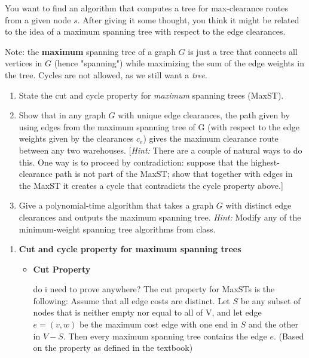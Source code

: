 \documentclass[letterpaper,11pt]{article}
\begin{document}
\begin{enumerate}
    You want to find an algorithm that computes a tree for max-clearance routes from a given node $s$. After giving it some thought, you think it might be related to the idea of a maximum spanning tree with respect to the edge clearances.
    
    Note: the \textbf{maximum} spanning tree of a graph $G$ is just a tree that connects all vertices in $G$ (hence "spanning") while maximizing the sum of the edge weights in the tree. Cycles are not allowed, as we still want a \emph{tree}.
   
    
    \begin{enumerate}
        \item State the cut and  cycle property for \textit{maximum} spanning trees (MaxST). 
    
        \item Show that in any graph $G$ with unique edge clearances, the path given by using edges from the maximum spanning tree of G (with respect to the edge weights given by the clearances $c_e$) gives the maximum clearance route between any two warehouses. [\textit{Hint:} There are a couple of natural ways to do this. One way is to proceed by contradiction: suppose that the highest-clearance path is not part of the MaxST; show that together with edges in the MaxST it creates a cycle that contradicts the cycle property above.]
        
        \item Give a polynomial-time algorithm that takes a graph $G$ with distinct edge clearances and outputs the maximum spanning tree. \emph{Hint:} Modify any of the minimum-weight spanning tree algorithms from class.
    \end{enumerate}

    \begin{enumerate}
        \color{teal}
        \item \textbf{Cut and cycle property for maximum spanning trees}
            \begin{itemize}
                \item \textbf{Cut Property}

                    \color{red} do i need to prove anywhere? \color{teal}
                    The cut property for MaxSTs is the following: Assume that 
                    all edge costs are distinct. Let $S$ be any subset of nodes
                    that is neither empty nor equal to all of V, and let edge
                    $e = (v, w)$ be the maximum cost edge with one end in $S$ 
                    and the other in $V - S$. Then every maximum spanning tree 
                    contains the edge $e$. (Based on the property as defined 
                    in the textbook)


\end{itemize}
\end{enumerate}
\end{enumerate}
\end{document}
